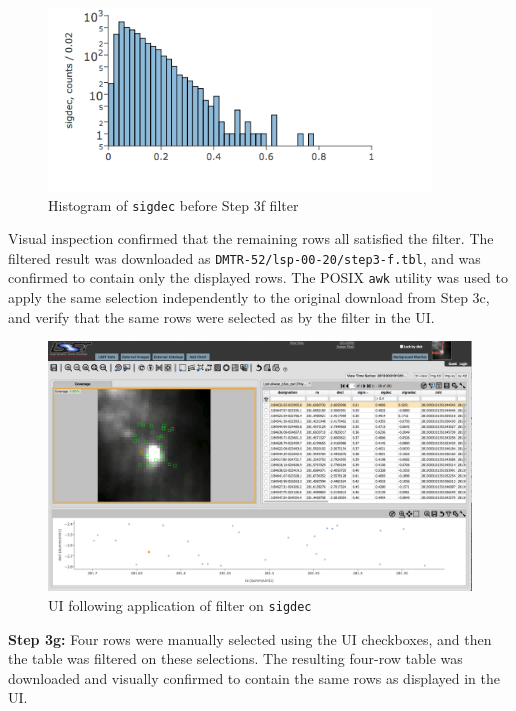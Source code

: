 \begin{figure}
  \centering
  \includegraphics[width=4in]{lsp-00-20/step3-f-sigdec-hist.png}
  \caption{Histogram of \texttt{sigdec} before Step 3f filter}
  \label{fig:lsp-00-20-sigdec-hist}
\end{figure}

Visual inspection confirmed that the remaining rows all satisfied the filter.
The filtered result was downloaded as \verb|DMTR-52/lsp-00-20/step3-f.tbl|,
and was confirmed to contain only the displayed rows.
The POSIX \verb|awk| utility was used to apply the same selection independently to the original download from Step 3c,
and verify that the same rows were selected as by the filter in the UI.

\begin{figure}
  \includegraphics[width=\linewidth]{lsp-00-20/step3-f.png}
  \caption{UI following application of filter on \texttt{sigdec}}
  \label{fig:lsp-00-20-sigdec-filter}
\end{figure}

\textbf{Step 3g:} Four rows were manually selected using the UI checkboxes,
and then the table was filtered on these selections.
The resulting four-row table was downloaded and visually confirmed to contain the same rows as displayed in the UI.

